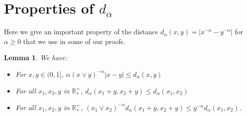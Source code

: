 \documentclass[11pt,a4paper]{article}
\newcommand{\RRP}{\mathbb{R}^+_*}
\newtheorem{lemma}[theorem]{Lemma}
\begin{document}

\section{Properties of $d_\alpha$}
Here we give an important property of the distance $d_\alpha(x,y) = |x^{-\alpha} - y^{-\alpha}|$ for $\alpha \geq 0$ that we use in some of our proofs.
\begin{lemma}\label{lem:properties-of-d-alpha}
    We have:
    \begin{itemize}
        \item For $x,y \in (0,1]$, $\alpha(x \vee y)^{-\alpha}|x - y| \leq d_\alpha(x,y)$
        \item For all $x_1,x_2, y$ in $\RRP$, $d_\alpha(x_1 + y,x_2 + y) \leq d_\alpha(x_1,x_2)$
        \item For all $x_1,x_2, y$ in $\RRP$, $(x_1 \vee x_2)^{-\alpha} d_\alpha(x_1 + y,x_2 + y) \leq y^{-\alpha} d_\alpha(x_1,x_2)$.
    \end{itemize}
\end{lemma}
\end{document}
